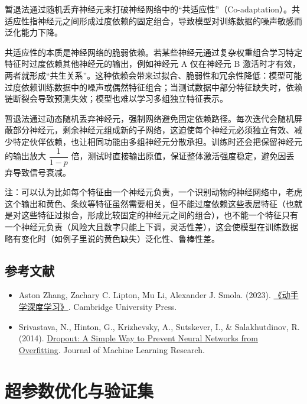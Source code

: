 暂退法通过随机丢弃神经元来打破神经网络中的``共适应性''（Co-adaptation）。共适应性指神经元之间形成过度依赖的固定组合，导致模型对训练数据的噪声敏感而泛化能力下降。

共适应性的本质是神经网络的脆弱依赖。若某些神经元通过复杂权重组合学习特定特征时过度依赖其他神经元的输出，例如神经元 A 仅在神经元 B 激活时才有效，两者就形成``共生关系''。这种依赖会带来过拟合、脆弱性和冗余性降低：模型可能过度依赖训练数据中的噪声或偶然特征组合；当测试数据中部分特征缺失时，依赖链断裂会导致预测失效；模型也难以学习多组独立特征表示。

暂退法通过动态随机丢弃神经元，强制网络避免固定依赖路径。每次迭代会随机屏蔽部分神经元，剩余神经元组成新的子网络，这迫使每个神经元必须独立有效、减少特定伙伴依赖，也让相同功能由多组神经元分散承担。训练时还会把保留神经元的输出放大 \(\dfrac{1}{1-p}\) 倍，测试时直接输出原值，保证整体激活强度稳定，避免因丢弃导致信号衰减。

注：可以认为比如每个特征由一个神经元负责，一个识别动物的神经网络中，老虎这个输出和黄色、条纹等特征虽然需要相关，但不能过度依赖这些表层特征（也就是对这些特征过拟合，形成比较固定的神经元之间的组合），也不能一个特征只有一个神经元负责（风险大且数字只能上下调，灵活性差），这会使模型在训练数据略有变化时（如例子里说的黄色缺失）泛化性、鲁棒性差。

\hypertarget{ux53c2ux8003ux6587ux732e-4}{%
\subsection{参考文献}\label{ux53c2ux8003ux6587ux732e-4}}

\begin{itemize}
\tightlist
\item
  Aston Zhang, Zachary C. Lipton, Mu Li, Alexander J. Smola. (2023). \href{https://zh.d2l.ai/}{《动手学深度学习》}. Cambridge University Press.
\item
  Srivastava, N., Hinton, G., Krizhevsky, A., Sutskever, I., \& Salakhutdinov, R. (2014). \href{https://jmlr.org/papers/v15/srivastava14a.html}{Dropout: A Simple Way to Prevent Neural Networks from Overfitting}. Journal of Machine Learning Research.
\end{itemize}

\clearpage

\hypertarget{ux8d85ux53c2ux6570ux4f18ux5316ux4e0eux9a8cux8bc1ux96c6}{%
\section{超参数优化与验证集}\label{ux8d85ux53c2ux6570ux4f18ux5316ux4e0eux9a8cux8bc1ux96c6}}

